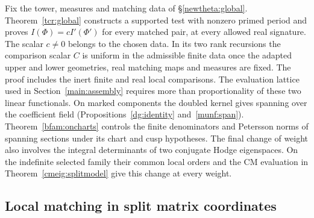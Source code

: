 Fix the tower, measures and matching data of \S\ref{newtheta:global}.
Theorem~\ref{tcr:global} constructs a supported test with nonzero
primed period and proves \(I(\Phi)=cI'(\Phi')\) for every matched
pair, at every allowed real signature. The scalar \(c\ne0\) belongs
to the chosen data. In its two rank recursions the comparison scalar
\(C\) is uniform in the admissible finite data once the adapted
upper and lower geometries, real matching maps and measures are
fixed. The proof includes the inert finite and real local comparisons.
The evaluation lattice used in Section~\ref{main:assembly} requires
more than proportionality of these two linear functionals. On
marked components the doubled kernel gives spanning over the
coefficient field (Propositions~\ref{dg:identity} and~\ref{munf:span}).
Theorem~\ref{bfam:oncharts} controls the finite denominators and
Petersson norms of spanning sections under its chart and cusp
hypotheses. The final change of weight also involves the integral
determinants of two conjugate Hodge eigenspaces. On the indefinite
selected family their common local orders and the CM evaluation
in Theorem~\ref{cmeig:splitmodel} give this change at every weight.

\subsection{Local matching in split matrix coordinates}\label{newtheta:local}

